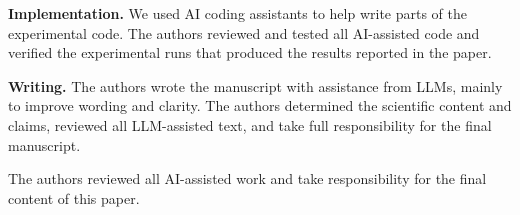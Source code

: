 \documentclass{article} %
\begin{document}
\textbf{Implementation.} We used AI coding assistants to help write parts of the experimental code. The authors reviewed and tested all AI-assisted code and verified the experimental runs that produced the results reported in the paper.

\textbf{Writing.} The authors wrote the manuscript with assistance from LLMs, mainly to improve wording and clarity. The authors determined the scientific content and claims, reviewed all LLM-assisted text, and take full responsibility for the final manuscript.

The authors reviewed all AI-assisted work and take responsibility for the final content of this paper.
\end{document}
